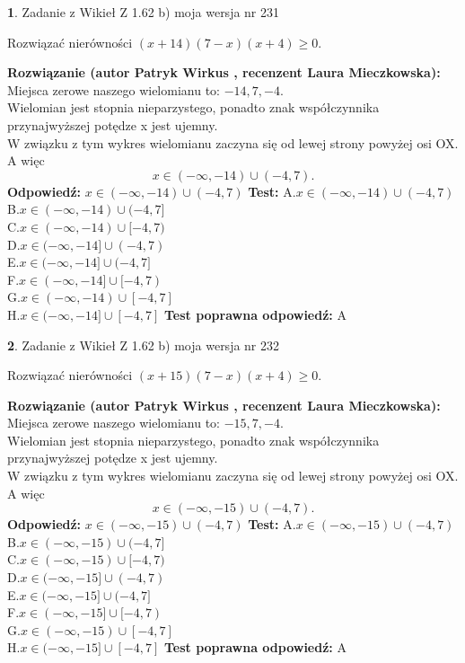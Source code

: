 \documentclass[12pt, a4paper]{article}
\theoremstyle{definition} %
\newtheorem{zad}{}
\newcommand{\zadStart}[1]{\begin{zad}#1\newline}
\newcommand{\zadStop}{\end{zad}}
\newcommand{\rozwStart}[2]{\noindent \textbf{Rozwiązanie (autor #1 , recenzent #2): }\newline}
\newcommand{\rozwStop}{\newline}
\newcommand{\odpStart}{\noindent \textbf{Odpowiedź:}\newline}
\newcommand{\odpStop}{\newline}
\newcommand{\testStart}{\noindent \textbf{Test:}\newline}
\newcommand{\testStop}{\newline}
\newcommand{\kluczStart}{\noindent \textbf{Test poprawna odpowiedź:}\newline}
\newcommand{\kluczStop}{\newline}
\begin{document}
\zadStart{Zadanie z Wikieł Z 1.62 b) moja wersja nr 231}

Rozwiązać nierówności $(x+14)(7-x)(x+4)\ge0$.
\zadStop
\rozwStart{Patryk Wirkus}{Laura Mieczkowska}
Miejsca zerowe naszego wielomianu to: $-14, 7, -4$.\\
Wielomian jest stopnia nieparzystego, ponadto znak współczynnika przy\linebreak najwyższej potędze x jest ujemny.\\ W związku z tym wykres wielomianu zaczyna się od lewej strony powyżej osi OX. A więc $$x \in (-\infty,-14) \cup (-4,7).$$
\rozwStop
\odpStart
$x \in (-\infty,-14) \cup (-4,7)$
\odpStop
\testStart
A.$x \in (-\infty,-14) \cup (-4,7)$\\
B.$x \in (-\infty,-14) \cup (-4,7]$\\
C.$x \in (-\infty,-14) \cup [-4,7)$\\
D.$x \in (-\infty,-14] \cup (-4,7)$\\
E.$x \in (-\infty,-14] \cup (-4,7]$\\
F.$x \in (-\infty,-14] \cup [-4,7)$\\
G.$x \in (-\infty,-14) \cup [-4,7]$\\
H.$x \in (-\infty,-14] \cup [-4,7]$
\testStop
\kluczStart
A
\kluczStop



\zadStart{Zadanie z Wikieł Z 1.62 b) moja wersja nr 232}

Rozwiązać nierówności $(x+15)(7-x)(x+4)\ge0$.
\zadStop
\rozwStart{Patryk Wirkus}{Laura Mieczkowska}
Miejsca zerowe naszego wielomianu to: $-15, 7, -4$.\\
Wielomian jest stopnia nieparzystego, ponadto znak współczynnika przy\linebreak najwyższej potędze x jest ujemny.\\ W związku z tym wykres wielomianu zaczyna się od lewej strony powyżej osi OX. A więc $$x \in (-\infty,-15) \cup (-4,7).$$
\rozwStop
\odpStart
$x \in (-\infty,-15) \cup (-4,7)$
\odpStop
\testStart
A.$x \in (-\infty,-15) \cup (-4,7)$\\
B.$x \in (-\infty,-15) \cup (-4,7]$\\
C.$x \in (-\infty,-15) \cup [-4,7)$\\
D.$x \in (-\infty,-15] \cup (-4,7)$\\
E.$x \in (-\infty,-15] \cup (-4,7]$\\
F.$x \in (-\infty,-15] \cup [-4,7)$\\
G.$x \in (-\infty,-15) \cup [-4,7]$\\
H.$x \in (-\infty,-15] \cup [-4,7]$
\testStop
\kluczStart
A
\kluczStop
\end{document}
